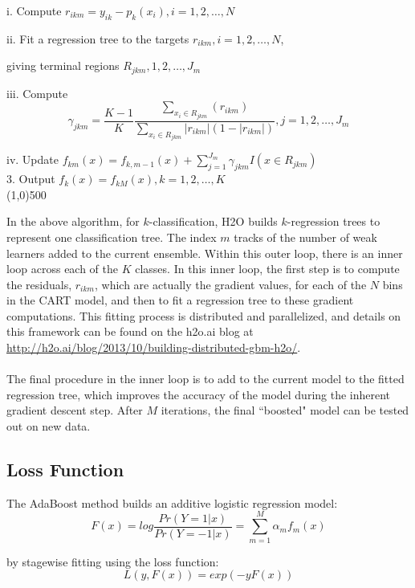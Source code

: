\hspace{2cm} i. Compute $r_{ikm} = y_{ik} - p_k(x_i),  i = 1,2,\dots,N$

\hspace{2cm} ii. Fit a regression tree to the targets $r_{ikm}, i = 1,2,\dots,N$,
\par \hspace{2.5cm} giving terminal regions $R_{jkm}, 1,2,\dots,J_m$

\hspace{2cm}iii. Compute $$\gamma_{jkm} = \frac{K-1}{K} \frac{\sum_{x_i \in R_{jkm}} (r_{ikm})}{\sum_{x_i \in R_{jkm}} |r_{ikm}| (1 - |r_{ikm}|)} , j=1,2,\dots,J_m$$

\hspace{2cm} iv. Update $f_{km}(x) = f_{k,m-1}(x) + \sum_{j=1}^{J_m} \gamma_{jkm} I(x \in R_{jkm})$
\\
3. Output $f_k^{\hat{}}(x) = f_{kM}(x),  k=1,2,\dots,K$
\\
\line(1,0){500}

In the above algorithm, for $k$-classification, H2O builds $k$-regression trees to represent one classification tree. The index $m$ tracks of the number of weak learners added to the current ensemble. Within this outer loop, there is an inner loop across each of the $K$ classes. In this inner loop, the first step is to compute the residuals, $r_{ikm}$, which are actually the gradient values, for each of the $N$ bins in the CART model, and then to fit a regression tree to these gradient computations. This fitting process is distributed and parallelized, and details on this framework can be found on the h2o.ai blog at {\url{http://h2o.ai/blog/2013/10/building-distributed-gbm-h2o/}}.
\\
\\
The final procedure in the inner loop is to add to the current model to the fitted regression tree, which improves the accuracy of the model during the inherent gradient descent step. After $M$ iterations, the final ``boosted" model can be tested out on new data.

\subsection{Loss Function}
The AdaBoost method builds an additive logistic regression model:
$${F(x) = log}\frac{Pr(Y = 1|x)}{Pr(Y = -1|x)} = \sum_{m=1}^{M} \alpha_m f_m (x) $$

by stagewise fitting using the loss function:
$$L(y, F(x)) = exp(-y  F (x)) $$


